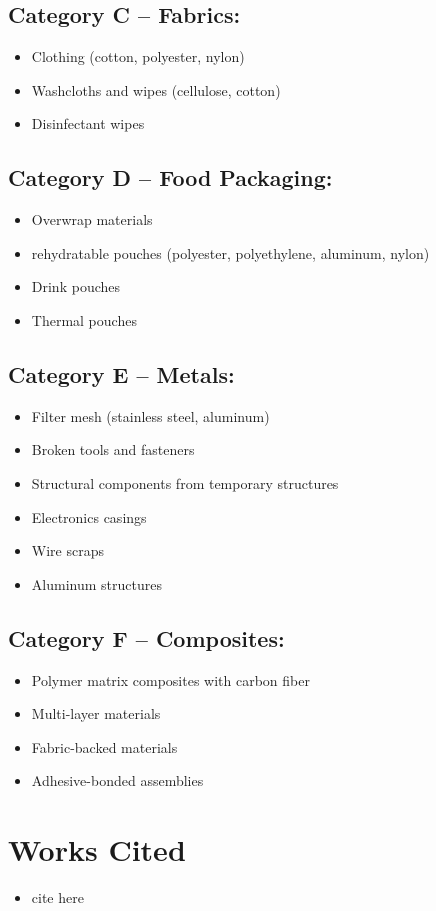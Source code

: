 \documentclass[12pt, a4paper]{article}
\begin{document}
\subsection{Category C -- Fabrics: }
\begin{itemize}
    \item Clothing (cotton, polyester, nylon)
    \item Washcloths and wipes (cellulose, cotton)
    \item Disinfectant wipes 
\end{itemize}

\subsection{Category D -- Food Packaging: }
\begin{itemize}
    \item Overwrap materials
    \item rehydratable pouches (polyester, polyethylene, aluminum, nylon)
    \item Drink pouches
    \item Thermal pouches
\end{itemize}

\subsection{Category E -- Metals: }
\begin{itemize}
    \item Filter mesh (stainless steel, aluminum)
    \item Broken tools and fasteners
    \item Structural components from temporary structures
    \item Electronics casings
    \item Wire scraps
    \item Aluminum structures
\end{itemize}

\subsection{Category F -- Composites: }
\begin{itemize}
    \item Polymer matrix composites with carbon fiber
    \item Multi-layer materials
    \item Fabric-backed materials
    \item Adhesive-bonded assemblies
\end{itemize}

\newpage 
\section*{Works Cited}
\begin{itemize}
    \item cite here
\end{itemize}
\end{document}
